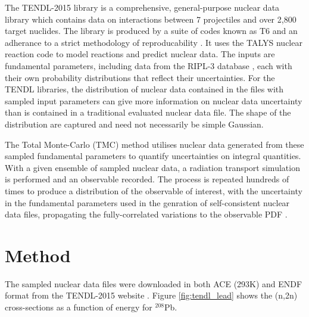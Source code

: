 The TENDL-2015 library is a comprehensive, general-purpose nuclear data library which contains data on interactions between 7 projectiles and over 2,800 target nuclides. The library is produced by a suite of codes known as T6 and an adherance to a strict methodology of reproducability \cite{Rochman2016}. It uses the TALYS nuclear reaction code to model reactions and predict nuclear data. The inputs are fundamental parameters, including data from the RIPL-3 database \cite{RIPL3}, each with their own probability distributions that reflect their uncertainties. For the TENDL libraries, the distribution of nuclear data contained in the files with sampled input parameters can give more information on nuclear data uncertainty than is contained in a traditional evaluated nuclear data file. The shape of the distribution are captured and need not necessarily be simple Gaussian.

The Total Monte-Carlo (TMC) method utilises nuclear data generated from these sampled fundamental parameters to quantify uncertainties on integral quantities. With a given ensemble of sampled nuclear data, a radiation transport simulation is performed and an observable recorded. The process is repeated hundreds of times to produce a distribution of the observable of interest, with the uncertainty in the fundamental parameters used in the genration of self-consistent nuclear data files, propagating the fully-correlated variations to the observable PDF \cite{Koning2008}.

\section{Method}
The sampled nuclear data files were downloaded in both ACE (293K) and ENDF format from the TENDL-2015 website \cite{TENDL2015}. Figure \ref{fig:tendl_lead} shows the (n,2n) cross-sections as a function of energy for $^{208}$Pb. 


